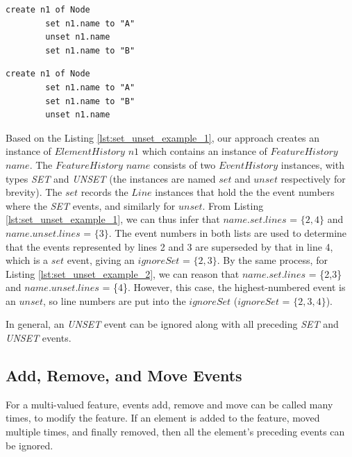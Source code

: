 \documentclass{llncs}
\begin{document}
    \noindent
    \begin{minipage}[t]{0.49\linewidth}
        \begin{lstlisting}[style=eol,caption={A CBP representation of attribute \emph{name} assignments.},label=lst:set_unset_example_1]
        create n1 of Node
        set n1.name to "A"
        unset n1.name
        set n1.name to "B"
        \end{lstlisting}
    \end{minipage}
    \hfill
    \begin{minipage}[t]{0.49\linewidth}
        \begin{lstlisting}[style=eol,caption={A CBP representation of attribute \emph{name} assignments.},label=lst:set_unset_example_2]
        create n1 of Node
        set n1.name to "A"
        set n1.name to "B"
        unset n1.name
        \end{lstlisting}
    \end{minipage}
    
    Based on the Listing \ref{lst:set_unset_example_1}, our approach creates an instance of $ElementHistory$ $n1$ which contains an instance of $FeatureHistory$ $name$. The $FeatureHistory$ $name$ consists of two $EventHistory$ instances, with types \textit{SET} and \textit{UNSET} (the instances are named $set$ and $unset$ respectively for brevity). The $set$ records the $Line$ instances that hold the the event numbers where the \textit{SET} events, and similarly for $unset$.  From Listing \ref{lst:set_unset_example_1}, we can thus infer that $name$.$set$.$lines$ = $\{2,4\}$ and $name$.$unset$.$lines$ = $\{3\}$. The event numbers in both lists are used to determine that the events represented by lines 2 and 3 are superseded by that in line 4, which is a $set$ event, giving an $ignoreSet$ = $\{2, 3\}$.  By the same process, for Listing \ref{lst:set_unset_example_2}, we can reason that $name$.$set$.$lines$ = \{2,3\} and $name$.$unset$.$lines$ = \{4\}.  However, this case, the highest-numbered event is an $unset$, so line numbers are put into the $ignoreSet$ ($ignoreSet$ = $\{2, 3, 4\}$).  
    
    In general, an \textit{UNSET} event can be ignored along with all preceding \textit{SET} and \textit{UNSET} events. 
    
    \subsection{Add, Remove, and Move Events}\label{subsec:add_remove_and_move_operations}
    For a multi-valued feature, events add, remove and move can be called many times, to modify the feature. If an element is added to the feature, moved multiple times, and finally removed, then all the element's preceding events can be ignored. 
    
\end{document}
